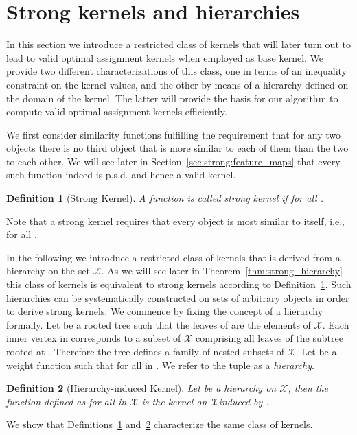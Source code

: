 \documentclass{article}
\newtheorem{definition}{Definition}
\newcommand{\X}{\ensuremath{\mathcal{X}}\xspace}
\begin{document}
\section{Strong kernels and hierarchies}
In this section we introduce a restricted class of kernels that will later turn 
out to lead to valid optimal assignment kernels when employed as base kernel.
We provide two different characterizations of this class, one in terms of an
inequality constraint on the kernel values, and the other by means of a hierarchy
defined on the domain of the kernel. The latter will provide the basis for our 
algorithm to compute valid optimal assignment kernels efficiently.

We first consider similarity functions fulfilling the requirement that for any 
two objects there is no third object that is more similar to each of them than 
the two to each other.
We will see later in Section~\ref{sec:strong:feature_maps} that every such 
function indeed is p.s.d. and hence a valid kernel.
\begin{definition}[Strong Kernel]\label{def:strong}
 A function 
  is called \emph{strong kernel} 
 if  for all .
\end{definition}
Note that a strong kernel requires that every object is most similar to itself, 
i.e.,   for all .


In the following we introduce a restricted class of kernels that is derived
from a hierarchy on the set \X. As we will see later in 
Theorem~\ref{thm:strong_hierarchy} this class of kernels is equivalent to 
strong kernels according to Definition~\ref{def:strong}.
Such hierarchies can be systematically constructed on sets of arbitrary objects 
in order to derive strong kernels.
We commence by fixing the concept of a hierarchy formally.
Let  be a rooted tree such that the leaves of  are the elements of 
\X.
Each inner vertex  in  corresponds to a subset of \X comprising 
all leaves of the subtree rooted at . Therefore the tree  defines a 
family of nested subsets of \X. 
Let  be a weight function such that  for
all  in . We refer to the tuple  as a \emph{hierarchy}. 

\begin{definition}[Hierarchy-induced Kernel]\label{def:h_induced}
 Let  be a hierarchy on \X, then the function defined as
  for all  in \X is the 
 kernel on \X \emph{induced} by . 
\end{definition}

We show that Definitions~\ref{def:strong} and~\ref{def:h_induced} characterize 
the same class of kernels.
\end{document}

